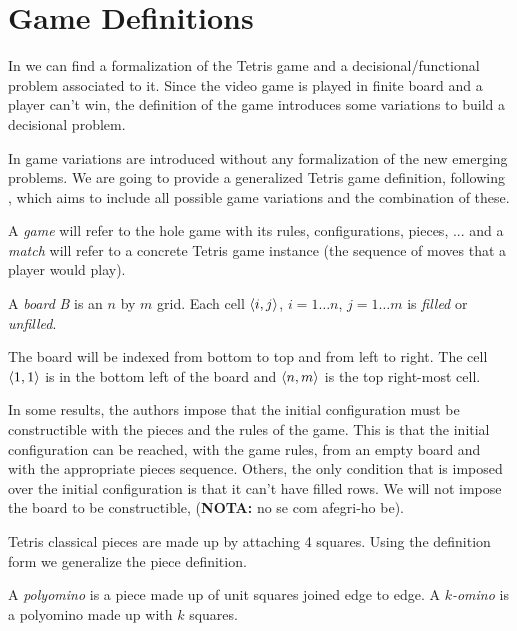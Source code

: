 \section{Game Definitions}

In \cite{TIH} we can find a formalization of the Tetris game and a decisional/functional problem associated to it. Since the video game is played in finite board and a player can't win, the definition of the game introduces some variations to build a decisional problem.

In \cite{TT,TWFP,TCB,CTV,AVG} game variations are introduced without any formalization of the new emerging problems. We are going to provide a generalized Tetris game definition, following \cite{TIH}, which aims to include all possible game variations and the combination of these. 

A \emph{game} will refer to the hole game with its rules, configurations, pieces, ... and a \emph{match} will refer to a concrete Tetris game instance (the sequence of moves that a player would play). 

\begin{definition} 
  A \emph{board} \emph{B} is an $n$ by $m$ grid. Each cell $\cell$, $i = 1\dots n$, $j = 1\dots m$ is \emph{filled} or \emph{unfilled}.
\end{definition}

The board will be indexed from bottom to top and from left to right. The cell $\cell[1][1]$ is in the bottom left of the board and $\cell[n][m]$ is the top right-most cell.

In some results, the authors impose that the initial configuration must be constructible with the pieces and the rules of the game. This is that the initial configuration can be reached, with the game rules, from an empty board and with the appropriate pieces sequence. Others, the only condition that is imposed over the initial configuration is that it can't have filled rows. We will not impose the board to be constructible, (\textbf{NOTA:} no se com afegri-ho be). 

\vspace{10px}

Tetris classical pieces are made up by attaching 4 squares. Using the definition form \cite{TT, WikiFandom} we generalize the piece definition.

\begin{definition}  
  A \emph{polyomino} is a piece made up of unit squares joined edge to edge. A \emph{$k$-omino} is a polyomino made up with $k$ squares.
\end{definition}

